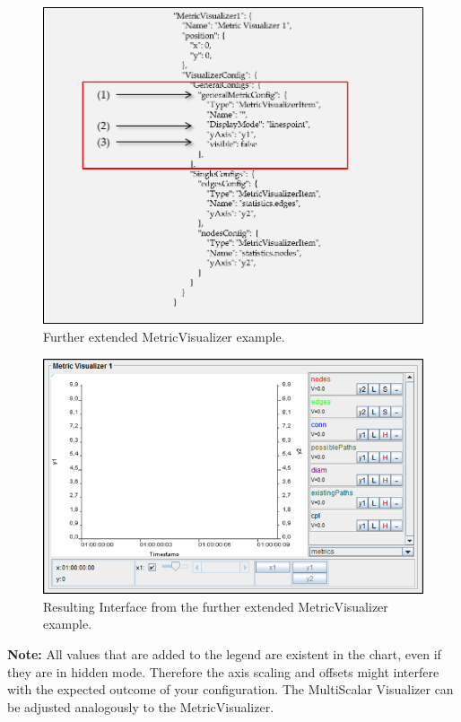 \begin{figure} [h]
\centering
\includegraphics [scale=1] {images/metricvis3}
\caption{Further extended MetricVisualizer example.}
\label{fig:metricvis3}
\end{figure}

\begin{figure} [h]
\centering
\includegraphics [scale=1] {images/metricvis4}
\caption{Resulting Interface from the further extended MetricVisualizer example.}
\label{fig:metricvis4}
\end{figure}

\textbf{Note:} All values that are added to the legend are existent in the chart, even if they are in hidden mode. Therefore the axis scaling and offsets might interfere with the expected outcome of your configuration. The MultiScalar Visualizer can be adjusted analogously to the MetricVisualizer.


